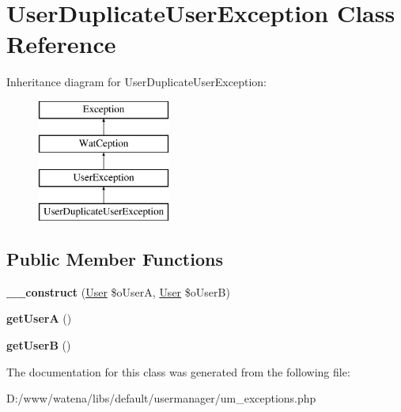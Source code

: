 \hypertarget{class_user_duplicate_user_exception}{\section{User\-Duplicate\-User\-Exception Class Reference}
\label{class_user_duplicate_user_exception}
}
Inheritance diagram for User\-Duplicate\-User\-Exception\-:\begin{figure}[H]
\begin{center}
\leavevmode
\includegraphics[height=4.000000cm]{class_user_duplicate_user_exception}
\end{center}
\end{figure}
\subsection*{Public Member Functions}
\begin{DoxyCompactItemize}
\item 
\hypertarget{class_user_duplicate_user_exception_ab8c086450ab7d0e9098de01f6bc30080}{{\bfseries \-\_\-\-\_\-construct} (\hyperlink{class_user}{User} \$o\-User\-A, \hyperlink{class_user}{User} \$o\-User\-B)}\label{class_user_duplicate_user_exception_ab8c086450ab7d0e9098de01f6bc30080}

\item 
\hypertarget{class_user_duplicate_user_exception_a2e3c59e9dba931032084a53fb70fcbbd}{{\bfseries get\-User\-A} ()}\label{class_user_duplicate_user_exception_a2e3c59e9dba931032084a53fb70fcbbd}

\item 
\hypertarget{class_user_duplicate_user_exception_a921159542c9c5eeb355e27de0ce7d9fc}{{\bfseries get\-User\-B} ()}\label{class_user_duplicate_user_exception_a921159542c9c5eeb355e27de0ce7d9fc}

\end{DoxyCompactItemize}


The documentation for this class was generated from the following file\-:\begin{DoxyCompactItemize}
\item 
D\-:/www/watena/libs/default/usermanager/um\-\_\-exceptions.\-php\end{DoxyCompactItemize}
